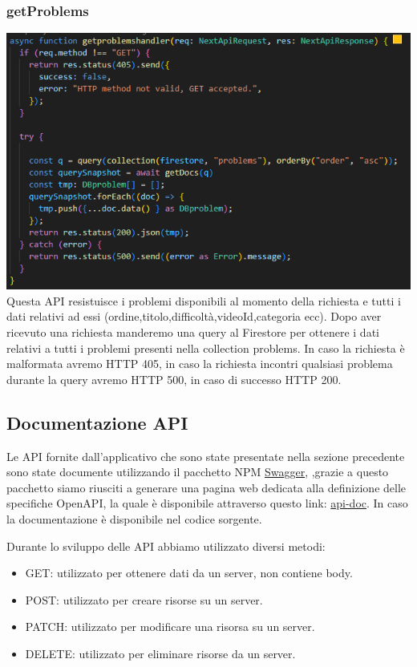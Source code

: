 \documentclass[11pt, a4paper]{article}
\theoremstyle{definition}
\begin{document}
\subsubsection{getProblems}
\includegraphics[width=\textwidth]{materiale/API/GetProblems.png}
Questa API resistuisce i problemi disponibili al momento della richiesta e tutti i dati relativi ad essi (ordine,titolo,difficoltà,videoId,categoria ecc).
Dopo aver ricevuto una richiesta manderemo una query al Firestore per ottenere i dati relativi a tutti i problemi presenti nella collection problems.
In caso la richiesta è malformata avremo HTTP 405, in caso la richiesta incontri qualsiasi problema durante la query avremo HTTP 500, in caso di successo HTTP 200.
\newpage
\subsection{Documentazione API}
Le API fornite dall'applicativo che sono state presentate nella sezione precedente sono state documente utilizzando il pacchetto NPM \href{https://www.npmjs.com/package/swagger}{Swagger},
,grazie a questo pacchetto siamo riusciti a generare una pagina web dedicata alla definizione delle specifiche OpenAPI, la quale è disponibile attraverso questo link: \href{https://sleepcode-dev.vercel.app/api-doc}{api-doc}.
In caso la documentazione è disponibile nel codice sorgente.

Durante lo sviluppo delle API abbiamo utilizzato diversi metodi:
\begin{itemize}
  \item GET: utilizzato per ottenere dati da un server, non contiene body.
  \item POST: utilizzato per creare risorse su un server.
  \item PATCH: utilizzato per modificare una risorsa su un server.
  \item DELETE: utilizzato per eliminare risorse da un server.
\end{itemize}
\end{document}
